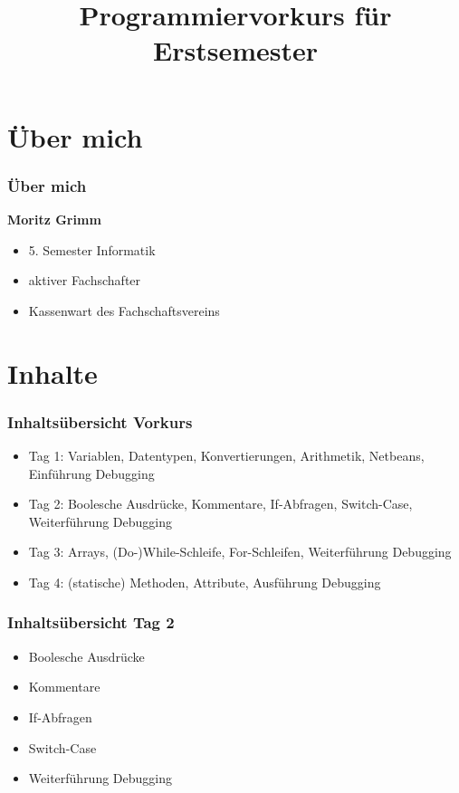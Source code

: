 \documentclass[final]{beamer}
\title{Programmiervorkurs für Erstsemester}
\begin{document}
\lstset{tabsize=2}
\lstset{basicstyle=\small}
\lstset{language=java}
\lstset{showstringspaces=false}
\begin{frame}
  \titlepage
\end{frame}

\section{Über mich}
\begin{frame}
	\frametitle{Über mich}
	\textbf{Moritz Grimm}
	\begin{itemize}
		\item{5. Semester Informatik}
		\item{aktiver Fachschafter}
		\item{Kassenwart des Fachschaftsvereins}
	\end{itemize}
\end{frame}

\section{Inhalte}
\begin{frame}
	\frametitle{Inhaltsübersicht Vorkurs}
	\begin{itemize}
		\item {Tag 1: Variablen, Datentypen, Konvertierungen, Arithmetik, Netbeans, Einführung Debugging}
		\item {Tag 2: Boolesche Ausdrücke, Kommentare, If-Abfragen, Switch-Case, Weiterführung Debugging}
		\item {Tag 3: Arrays, (Do-)While-Schleife, For-Schleifen, Weiterführung Debugging}
		\item {Tag 4: (statische) Methoden, Attribute, Ausführung Debugging}
	\end{itemize}
\end{frame}

\begin{frame}
	\frametitle{Inhaltsübersicht Tag 2}
	\begin{itemize}
		\item {Boolesche Ausdrücke}
		\item {Kommentare}
		\item {If-Abfragen}
		\item {Switch-Case}
		\item {Weiterführung Debugging}
	\end{itemize}
\end{frame}
\end{document}
